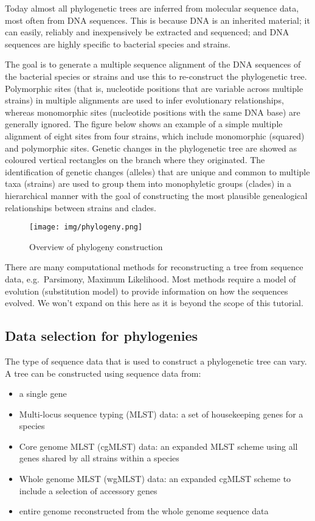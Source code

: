 \documentclass[11pt]{article}
\providecommand{\tightlist}{%
      \setlength{\itemsep}{0pt}\setlength{\parskip}{0pt}}
\begin{document}
Today almost all phylogenetic trees are inferred from molecular sequence
data, most often from DNA sequences. This is because DNA is an inherited
material; it can easily, reliably and inexpensively be extracted and
sequenced; and DNA sequences are highly specific to bacterial species
and strains.

The goal is to generate a multiple sequence alignment of the DNA
sequences of the bacterial species or strains and use this to
re-construct the phylogenetic tree. Polymorphic sites (that is,
nucleotide positions that are variable across multiple strains) in
multiple alignments are used to infer evolutionary relationships,
whereas monomorphic sites (nucleotide positions with the same DNA base)
are generally ignored. The figure below shows an example of a simple
multiple alignment of eight sites from four strains, which include
monomorphic (squared) and polymorphic sites. Genetic changes in the
phylogenetic tree are showed as coloured vertical rectangles on the
branch where they originated. The identification of genetic changes
(alleles) that are unique and common to multiple taxa (strains) are used
to group them into monophyletic groups (clades) in a hierarchical manner
with the goal of constructing the most plausible genealogical
relationships between strains and clades.

    \begin{figure}
\centering
\texttt{[image: img/phylogeny.png]}
\caption{Overview of phylogeny construction}
\end{figure}

    There are many computational methods for reconstructing a tree from
sequence data, e.g.~Parsimony, Maximum Likelihood. Most methods require
a model of evolution (substitution model) to provide information on how
the sequences evolved. We won't expand on this here as it is beyond the
scope of this tutorial.

    \hypertarget{data-selection-for-phylogenies}{%
\subsection{Data selection for
phylogenies}\label{data-selection-for-phylogenies}}

The type of sequence data that is used to construct a phylogenetic tree
can vary. A tree can be constructed using sequence data from:

\begin{itemize}
\tightlist
\item
  a single gene
\item
  Multi-locus sequence typing (MLST) data: a set of housekeeping genes
  for a species
\item
  Core genome MLST (cgMLST) data: an expanded MLST scheme using all
  genes shared by all strains within a species
\item
  Whole genome MLST (wgMLST) data: an expanded cgMLST scheme to include
  a selection of accessory genes
\item
  entire genome reconstructed from the whole genome sequence data
\end{itemize}
\end{document}
